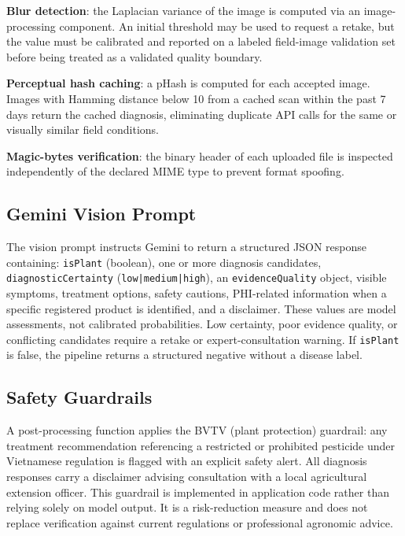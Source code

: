 \documentclass[conference]{IEEEtran}
\begin{document}
\textbf{Blur detection}: the Laplacian variance of the image is computed via an image-processing component. An initial threshold may be used to request a retake, but the value must be calibrated and reported on a labeled field-image validation set before being treated as a validated quality boundary.

\textbf{Perceptual hash caching}: a pHash is computed for each accepted image. Images with Hamming distance below 10 from a cached scan within the past 7 days return the cached diagnosis, eliminating duplicate API calls for the same or visually similar field conditions.

\textbf{Magic-bytes verification}: the binary header of each uploaded file is inspected independently of the declared MIME type to prevent format spoofing.

\subsection{Gemini Vision Prompt}

The vision prompt instructs Gemini to return a structured JSON response containing: \texttt{isPlant} (boolean), one or more diagnosis candidates, \texttt{diagnosticCertainty} (\texttt{low|medium|high}), an \texttt{evidenceQuality} object, visible symptoms, treatment options, safety cautions, PHI-related information when a specific registered product is identified, and a disclaimer. These values are model assessments, not calibrated probabilities. Low certainty, poor evidence quality, or conflicting candidates require a retake or expert-consultation warning. If \texttt{isPlant} is false, the pipeline returns a structured negative without a disease label.

\subsection{Safety Guardrails}

A post-processing function applies the BVTV (plant protection) guardrail: any treatment recommendation referencing a restricted or prohibited pesticide under Vietnamese regulation is flagged with an explicit safety alert. All diagnosis responses carry a disclaimer advising consultation with a local agricultural extension officer. This guardrail is implemented in application code rather than relying solely on model output. It is a risk-reduction measure and does not replace verification against current regulations or professional agronomic advice.
\end{document}
